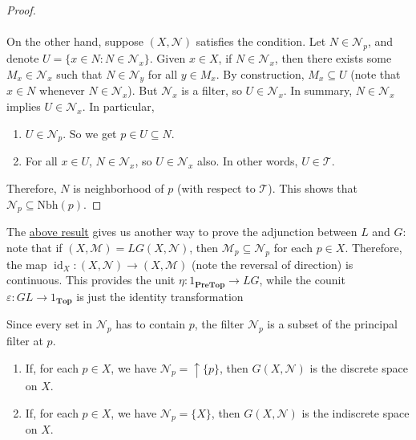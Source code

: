 \documentclass{treatise}
\begin{document}
\begin{shaded}
\begin{proof}
\\
\\
On the other hand, suppose $(X, \mathcal{N})$ satisfies the condition. Let $N \in \mathcal{N}_p$, and denote $U = \{ x \in N : N \in \mathcal{N}_x \}$. Given $x \in X$, if $N \in \mathcal{N}_x$, then there exists some $M_x \in \mathcal{N}_x$ such that $N \in \mathcal{N}_y$ for all $y \in M_x$. By construction, $M_x \subseteq U$ (note that $x \in N$ whenever $N \in \mathcal{N}_x$). But $\mathcal{N}_x$ is a filter, so $U \in \mathcal{N}_x$. In summary, $N \in \mathcal{N}_x$ implies $U \in \mathcal{N}_x$. In particular,
\begin{enumerate}
    \item $U \in \mathcal{N}_p$. So we get $p \in U \subseteq N$.
    \item For all $x \in U$, $N \in \mathcal{N}_x$, so $U \in \mathcal{N}_x$ also. In other words, $U \in \mathcal{T}$.
\end{enumerate}
Therefore, $N$ is neighborhood of $p$ (with respect to $\mathcal{T}$). This shows that $\mathcal{N}_p \subseteq \mathrm{Nbh}(p)$.
\end{proof}
\begin{remark}
The \hyperref[topo-neigh-sys]{above result} gives us another way to prove the adjunction between $L$ and $G$: note that if $(X, \mathcal{M}) = LG(X, \mathcal{N})$, then $\mathcal{M}_p \subseteq \mathcal{N}_p$ for each $p \in X$. Therefore, the map $\operatorname{id}_X : (X, \mathcal{N}) \to (X, \mathcal{M})$ (note the reversal of direction) is continuous. This provides the unit $\eta: 1_{\mathbf{PreTop}} \to LG$, while the counit $\varepsilon: GL \to 1_{\mathbf{Top}}$ is just the identity transformation
\end{remark}
\begin{example}
Since every set in $\mathcal{N}_p$ has to contain $p$, the filter $\mathcal{N}_p$ is a subset of the principal filter at $p$.
\begin{enumerate}
    \item If, for each $p \in X$, we have $\mathcal{N}_p = \uparrow \{ p \}$, then $G(X, \mathcal{N})$ is the discrete space on $X$.
    \item If, for each $p \in X$, we have $\mathcal{N}_p = \{ X \}$, then $G(X, \mathcal{N})$ is the indiscrete space on $X$.
\end{enumerate}
\end{example}


\end{shaded}
\end{document}

